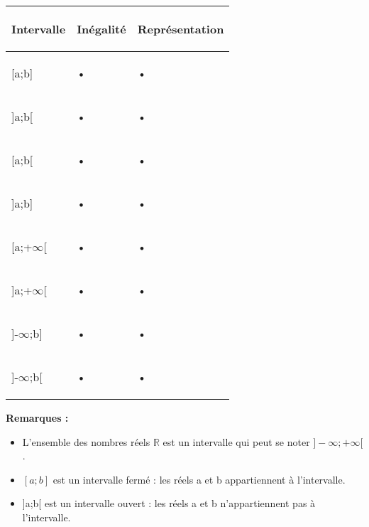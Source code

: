 \documentclass[a4paper,14pt,twoside,french]{extarticle}
\newcommand{\R}{\ensuremath{\mathbb{R}}\xspace}
\newcommand{\bi}{\begin{itemize}}
\newcommand{\ei}{\end{itemize}}
\begin{document}
\begin{tabular}{|p{3cm}|p{6cm}|p{7cm}|}
\hline 

 \begin{center}
 \textbf{Intervalle}
 \end{center}
  & \begin{center}
 \textbf{Inégalité}
 \end{center} & \begin{center}
\textbf{Représentation}
\end{center} \\ 
\hline 
\begin{center}
 [a;b]
 \end{center} & • & • \\ 
\hline 
\begin{center}
]a;b[ 
\end{center}& • & • \\ 
\hline 
\begin{center}
 [a;b[
 \end{center} & • & • \\ 
\hline 
\begin{center}
 ]a;b]
 \end{center} & • & • \\ 
\hline 
\begin{center}
 [a;+$\infty$[
 \end{center} & • & • \\ 
\hline 
\begin{center}
]a;+$\infty$[ 
\end{center}& • & • \\ 
\hline 
\begin{center}
 ]-$\infty$;b]
 \end{center} & • & • \\ 
\hline 
 \begin{center}
 ]-$\infty$;b[
 \end{center} & • & • \\ 
\hline 
\end{tabular} 

\vspace*{1cm}
\textbf{Remarques :}
\bi 
\item L'ensemble des nombres réels $\R$ est un intervalle qui peut se noter $]-\infty ; +\infty[$.
\item $[a ; b]$ est un intervalle fermé : les réels a et b appartiennent à l'intervalle.
\item ]a;b[ est un intervalle ouvert : les réels a et b n'appartiennent pas à l'intervalle.\\
\ei
\end{document}

